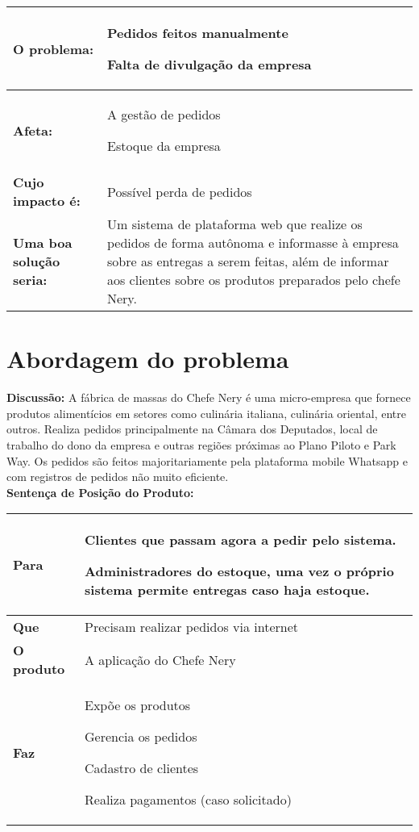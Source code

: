 \begin{apendicesenv}
\newcommand{\nextitem}{\par\hspace*{\labelsep}\textbullet\hspace*{\labelsep}}

\begin{tabular}{|l|p{3in}|}
  \hline
  \textbf{O problema:} & \nextitem Pedidos feitos manualmente
    \nextitem Falta de divulgação da empresa
    \\ \hline
  \textbf{Afeta:} & \nextitem A gestão de pedidos
    \nextitem Estoque da empresa
    \\ \hline
  \textbf{Cujo impacto é:} & \nextitem Possível perda de pedidos
    \\ \hline
  \textbf{Uma boa solução seria:} & \nextitem Um sistema de plataforma web que realize os pedidos de forma autônoma e informasse à empresa sobre as entregas a serem feitas, além de informar aos clientes sobre os produtos preparados pelo chefe Nery.
    \\ \hline

\end{tabular}

{\large {\section { Abordagem do problema \\ } } }

\textbf{Discussão:} A fábrica de massas do Chefe Nery é uma micro-empresa que fornece produtos alimentícios em setores como culinária italiana, culinária oriental, entre outros. Realiza pedidos principalmente na Câmara dos Deputados, local de trabalho do dono da empresa e outras regiões próximas ao Plano Piloto e Park Way. Os pedidos são feitos majoritariamente pela plataforma mobile Whatsapp e com registros de pedidos não muito eficiente. \\

\textbf{Sentença de Posição do Produto:}  \\

\begin{tabular}{|l|p{3in}|}
  \hline
  \textbf{Para} & \nextitem Clientes que passam agora a pedir pelo sistema.
    \nextitem Administradores do estoque, uma vez o próprio sistema permite entregas caso haja estoque.
    \\ \hline
  \textbf{Que} & \nextitem Precisam realizar pedidos via internet
    \\ \hline
  \textbf{O produto} & \nextitem A aplicação do Chefe Nery
    \\ \hline
  \textbf{Faz} & \nextitem Expõe os produtos
  \nextitem Gerencia os pedidos
  \nextitem Cadastro de clientes
  \nextitem Realiza pagamentos (caso solicitado)
    \\ \hline


\end{tabular}
\end{apendicesenv}
